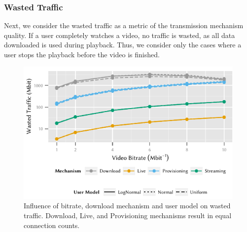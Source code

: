 \subsubsection*{Wasted Traffic}\label{sec:application:lte_video:numerical_evaluation:wasted_traffic}
Next, we consider the wasted traffic as a metric of the transmission mechanism quality.
If a user completely watches a video, no traffic is wasted, as all data downloaded is used during playback.
Thus, we consider only the cases where a user stops the playback before the video is finished.

\begin{figure}
  \centering
  \includegraphics{application/lte_video/numerical_evaluation/figures/bitrate2lostData}
  \caption{Influence of bitrate, download mechanism and user model on wasted traffic. Download, Live, and Provisioning mechanisms result in equal connection counts.}
  \label{fig:application:lte_video:numerical_evaluation:energy_consumption:bitrate2lostData}
\end{figure}

